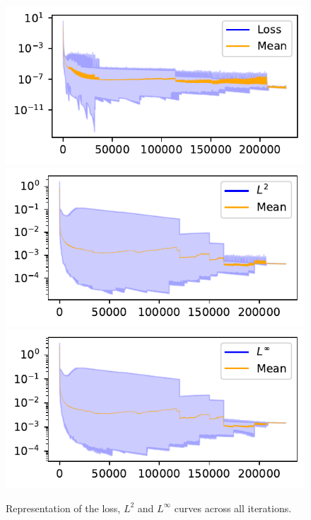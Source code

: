 \documentclass[12pt]{report} %
\begin{document}
\begin{figure}[h]
  \includegraphics[width=.7\textwidth]{imagenes/experiments/1d/statistical_1d_full_scheduler_interpolation/Loss_curves_semilogy_all.pdf}
  \includegraphics[width=.7\textwidth]{imagenes/experiments/1d/statistical_1d_full_scheduler_interpolation/L2_curves_semilogy_all.pdf}
  \includegraphics[width=.7\textwidth]{imagenes/experiments/1d/statistical_1d_full_scheduler_interpolation/Linf_curves_semilogy_all.pdf}
  \caption{Representation of the loss, $L^2$ and $L^\infty$ curves across all iterations.}
  \label{fig:u2-results-all}
\end{figure}
\end{document}
